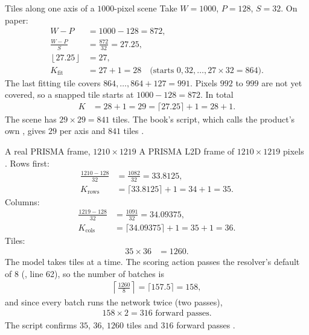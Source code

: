\begin{worked}[label={we:inference:tiles1000}]{Tiles along one axis of a $1000$-pixel scene}
Take $W=1000$, $P=128$, $S=32$. On paper:
\begin{align*}
W-P &= 1000-128 = 872,\\
\frac{W-P}{S} &= \frac{872}{32} = 27.25,\\
\left\lfloor 27.25\right\rfloor &= 27,\\
K_{\text{fit}} &= 27+1 = 28 \quad\text{(starts } 0, 32, \dots, 27\times32=864\text{)}.
\end{align*}
The last fitting tile covers $864,\dots,864+127=991$. Pixels $992$ to $999$ are not yet covered, so a snapped
tile starts at $1000-128=872$. In total
\begin{align*}
K &= 28+1 = 29 = \lceil 27.25\rceil+1 = 28+1.
\end{align*}
The scene has $29\times29=841$ tiles. The book's script, which calls the product's own
, gives $29$ per axis and $841$ tiles \tagC.
\end{worked}

\begin{worked}[label={we:inference:tilesprisma}]{A real PRISMA frame, $1210\times1219$}
A PRISMA L2D frame of $1210\times1219$ pixels . Rows first:
\begin{align*}
\frac{1210-128}{32} &= \frac{1082}{32} = 33.8125,\\
K_{\text{rows}} &= \lceil 33.8125\rceil+1 = 34+1 = 35.
\end{align*}
Columns:
\begin{align*}
\frac{1219-128}{32} &= \frac{1091}{32} = 34.09375,\\
K_{\text{cols}} &= \lceil 34.09375\rceil+1 = 35+1 = 36.
\end{align*}
Tiles:
\begin{align*}
35\times36 &= 1260.
\end{align*}
The model takes  tiles at a time. The scoring action passes the resolver's
default of $8$ (, line 62), so the number of batches is
\begin{align*}
\left\lceil\frac{1260}{8}\right\rceil = \lceil 157.5\rceil = 158,
\end{align*}
and since every batch runs the network twice (two passes),
\begin{align*}
158\times2 = 316 \text{ forward passes.}
\end{align*}
The script confirms $35$, $36$, $1260$ tiles and $316$ forward passes \tagC.
\end{worked}

